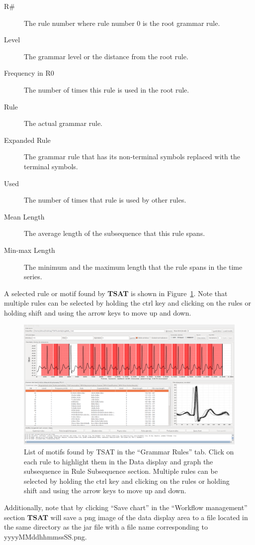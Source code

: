 \documentclass[letterpaper, 12pt]{article}
\newcommand\TSAT{\textbf{TSAT}}
\begin{document}
\begin{description}
	\item[R\#] The rule number where rule number 0 is the root grammar rule.
	\item[Level]  The grammar level or the distance from the root rule.
	\item[Frequency in R0]  The number of times this rule is used in the root rule.
	\item[Rule] The actual grammar rule.
	\item[Expanded Rule]  The grammar rule that has its non-terminal symbols replaced with the terminal symbols.
	\item[Used]  The number of times that rule is used by other rules.
	\item[Mean Length] The average length of the subsequence that this rule spans.
	\item[Min-max Length] The minimum and the maximum length that the rule spans in the time series.
\end{description}

A selected rule or motif found by {\TSAT} is shown in Figure~\ref{fig:step3-motifs}.  Note that multiple rules can be selected by holding the ctrl key and clicking on the rules or holding shift and using the arrow keys to move up and down.

\begin{figure}[H]
	\centering
	\includegraphics[width=0.7\linewidth]{pictures/motifguide/step3-motifs}
	\caption{List of motifs found by TSAT in the ``Grammar Rules'' tab.  Click on each rule to highlight them in the Data display and graph the subsequence in Rule Subsequence section.  Multiple rules can be selected by holding the ctrl key and clicking on the rules or holding shift and using the arrow keys to move up and down.}
	\label{fig:step3-motifs}
\end{figure}

Additionally, note that by clicking ``Save chart'' in the ``Workflow management'' section {\TSAT} will save a png image of the data display area to a file located in the same directory as the jar file with a file name corresponding to yyyyMMddhhmmssSS.png.
\end{document}
